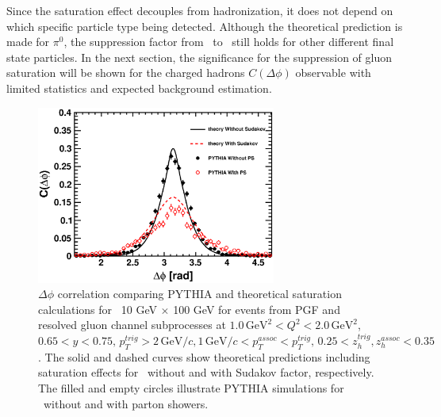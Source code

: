 Since the saturation effect decouples from hadronization, it does not
depend on which specific particle type being detected. Although the theoretical
prediction is made for $\pi^{0}$, the suppression factor from \ep\ to \eA\
still holds for other different final state particles. In the next section, the
significance for the suppression of gluon saturation will be shown for the
charged hadrons $C(\Delta\phi)$ observable with limited statistics and
expected background estimation.
\begin{figure} 
\begin{center}
\includegraphics[width=0.7\textwidth]{plots/chpt6/ep_10x100_Q2_1_y_0.7_theory_MC_compare_as_0.35.eps} 
\end{center} 
\caption[comparison of ep from PYTHIA and theory with Sudakov]
{\pion $\Delta\phi$ correlation comparing PYTHIA and theoretical saturation calculations
for \ep\ 10 GeV $\times$ 100 GeV for events from PGF and resolved gluon channel subprocesses
 at $1.0 \, \mathrm{GeV}^{2} < Q^{2} < 2.0 \, \mathrm{GeV}^{2}$, \, $0.65 < y < 0.75, \, p_{T}^{trig} > 2 \,
\mathrm{GeV/}c, 1 \, \mathrm{GeV/}c < p_{T}^{assoc} < p_{T}^{trig}, \,0.25 <
z_{h}^{trig}, z_{h}^{assoc} < 0.35$. The solid and dashed curves show theoretical predictions including 
saturation effects for \ep\ without and with Sudakov factor, respectively. 
The filled and empty circles illustrate PYTHIA simulations for \ep\ without and with parton showers. }
\label{fig:epCompareWithSud} 
\end{figure}


